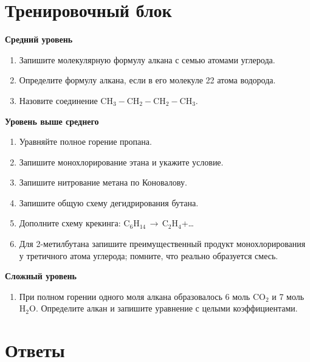 \documentclass[a4paper,12pt]{article}
\newcommand{\chem}[1]{\ensuremath{\mathrm{#1}}}
\begin{document}
\newpage
\section{Тренировочный блок}

\textbf{Средний уровень}
\begin{enumerate}
  \item Запишите молекулярную формулу алкана с семью атомами углерода.
  \item Определите формулу алкана, если в его молекуле 22 атома водорода.
  \item Назовите соединение \chem{CH_3-CH_2-CH_2-CH_3}.
\end{enumerate}

\textbf{Уровень выше среднего}
\begin{enumerate}[resume]
  \item Уравняйте полное горение пропана.
  \item Запишите монохлорирование этана и укажите условие.
  \item Запишите нитрование метана по Коновалову.
  \item Запишите общую схему дегидрирования бутана.
  \item Дополните схему крекинга: \chem{C_6H_{14}}\,$\rightarrow$\,\chem{C_2H_4}+\ldots
  \item Для 2-метилбутана запишите преимущественный продукт монохлорирования у третичного атома углерода; помните, что реально образуется смесь.
\end{enumerate}

\textbf{Сложный уровень}
\begin{enumerate}[resume]
  \item При полном горении одного моля алкана образовалось 6 моль \chem{CO_2} и 7 моль \chem{H_2O}. Определите алкан и запишите уравнение с целыми коэффициентами.
\end{enumerate}

\newpage
\section{Ответы}
\end{document}
